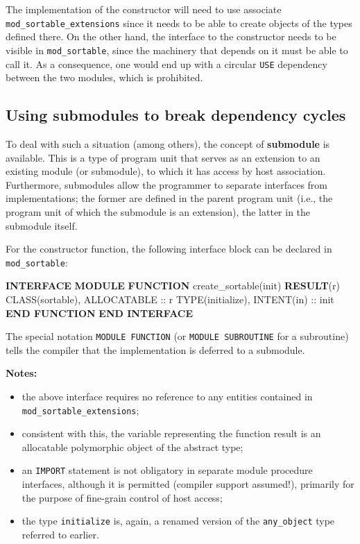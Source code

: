 \documentclass[]{scrartcl}
\newenvironment{Shaded}{}{}
\newcommand{\DataTypeTok}[1]{\textcolor[rgb]{0.56,0.13,0.00}{#1}}
\newcommand{\KeywordTok}[1]{\textcolor[rgb]{0.00,0.44,0.13}{\textbf{#1}}}
\newcommand{\NormalTok}[1]{#1}
\providecommand{\tightlist}{%
  \setlength{\itemsep}{0pt}\setlength{\parskip}{0pt}}
\begin{document}
The implementation of the constructor will need to use associate
\texttt{mod\_sortable\_extensions} since it needs to be able to create
objects of the types defined there. On the other hand, the interface to
the constructor needs to be visible in \texttt{mod\_sortable}, since the
machinery that depends on it must be able to call it. As a consequence,
one would end up with a circular \texttt{USE} dependency between the two
modules, which is prohibited.

\subsection{Using submodules to break dependency
cycles}\label{using-submodules-to-break-dependency-cycles}

To deal with such a situation (among others), the concept of
\textbf{submodule} is available. This is a type of program unit that
serves as an extension to an existing module (or submodule), to which it
has access by host association. Furthermore, submodules allow the
programmer to separate interfaces from implementations; the former are
defined in the parent program unit (i.e., the program unit of which the
submodule is an extension), the latter in the submodule itself.

For the constructor function, the following interface block can be
declared in \texttt{mod\_sortable}:

\begin{Shaded}
\begin{Highlighting}[]
\KeywordTok{INTERFACE}
   \KeywordTok{MODULE} \KeywordTok{FUNCTION}\NormalTok{ create\_sortable(init) }\KeywordTok{RESULT}\NormalTok{(r)}
      \DataTypeTok{CLASS(sortable)}\NormalTok{, }\DataTypeTok{ALLOCATABLE} \DataTypeTok{::}\NormalTok{ r}
      \DataTypeTok{TYPE(initialize)}\NormalTok{, }\DataTypeTok{INTENT(in)} \DataTypeTok{::}\NormalTok{ init}
   \KeywordTok{END FUNCTION}
\KeywordTok{END INTERFACE}
\end{Highlighting}
\end{Shaded}

The special notation \texttt{MODULE\ FUNCTION} (or
\texttt{MODULE\ SUBROUTINE} for a subroutine) tells the compiler that
the implementation is deferred to a submodule.

\textbf{Notes:}

\begin{itemize}
\tightlist
\item
  the above interface requires no reference to any entities contained in
  \texttt{mod\_sortable\_extensions};
\item
  consistent with this, the variable representing the function result is
  an allocatable polymorphic object of the abstract type;
\item
  an \texttt{IMPORT} statement is not obligatory in separate module
  procedure interfaces, although it is permitted (compiler support
  assumed!), primarily for the purpose of fine-grain control of host
  access;
\item
  the type \texttt{initialize} is, again, a renamed version of the
  \texttt{any\_object} type referred to earlier.
\end{itemize}
\end{document}

